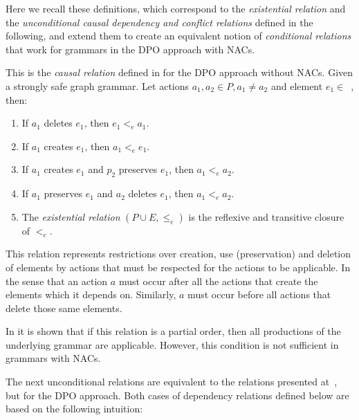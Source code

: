 Here we recall these definitions, which correspond to the \emph{existential relation} and the \emph{unconditional causal dependency and conflict relations} defined in the following, and extend them to create an equivalent notion of \emph{conditional relations} that work for grammars in the DPO approach with NACs.

\begin{definition} This is the \emph{causal relation} defined in \cite{Corradini1996} for the DPO approach without NACs. Given  \doublyTypedGraphGrammarCore{} a strongly safe graph grammar. Let actions $a_1, a_2 \in P, a_1 \ne a_2$ and element \mbox{$e_1 \in $ \coreGraph{}}, then:

  \begin{enumerate}
    \item If $a_1$ deletes $e_1$, then $e_1 <_e a_1$.
    \item If $a_1$ creates $e_1$, then $a_1 <_e e_1$.
    \item If $a_1$ creates $e_1$ and $p_2$ preserves $e_1$, then $a_1 <_e a_2$.
    \item If $a_1$ preserves $e_1$ and $a_2$ deletes $e_1$, then $a_1 <_e a_2$. 
    \item The \emph{existential relation} $(P \cup E, \leq_e)$ is the reflexive and transitive closure of $<_e$.
  \end{enumerate}
\end{definition}

This relation represents restrictions over creation, use (preservation) and deletion of elements by actions that must be respected for the actions to be applicable. In the sense that an action $a$ must occur after all the actions that create the elements which it depends on. Similarly, $a$ must occur before all actions that delete those same elements.

\begin{example}
\end{example}

In \cite{Corradini1996} it is shown that if this relation is a partial order, then all productions of the underlying grammar are applicable. However, this condition is not sufficient in grammars with NACs.

\begin{example}
\end{example}

The next unconditional relations are equivalent to the relations presented at~\cite{Ribeiro1996}, but for the DPO approach. Both cases of dependency relations defined below are based on the following intuition:

